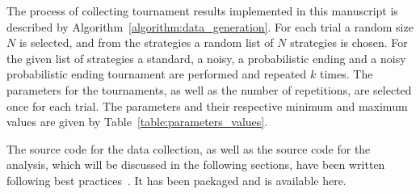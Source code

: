 The process of collecting tournament results implemented in this manuscript is described by
Algorithm~\ref{algorithm:data_generation}. For each trial a random size \(N\) is
selected, and from the \numberofstrategies strategies a random list of \(N\) strategies is
chosen. For the given list of strategies a standard, a noisy, a probabilistic
ending and a noisy probabilistic ending tournament are performed and repeated
\(k\) times. The parameters for the tournaments, as well as the number of
repetitions, are selected once for each trial. The parameters and their
respective minimum and maximum values are given by
Table~\ref{table:parameters_values}.

\begin{table}[!htbp]
    \begin{center}
    \end{center}
    \caption{Data collection; parameters' values}
    \label{table:parameters_values}
\end{table}

The source code for the data collection, as well as the source code for
the analysis, which will be discussed in the following sections, have been written
following best practices~\cite{Aberdour2007, Benureau2018}. It has been packaged
and is available here. %

